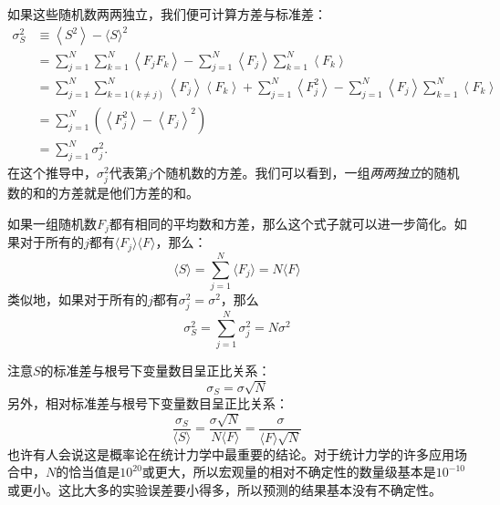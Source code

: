\documentclass[UTF8]{ctexart}
\numberwithin{equation}{section}%
\numberwithin{figure}{section}%
\begin{document}
    如果这些随机数两两独立，我们便可计算方差与标准差：
    \begin{equation}
        \begin{aligned}
            \sigma_{S}^{2} & \equiv\left\langle S^{2}\right\rangle-\langle S\rangle^{2} \\
            &=\sum_{j=1}^{N} \sum_{k=1}^{N}\left\langle F_{j} F_{k}\right\rangle-\sum_{j=1}^{N}\left\langle F_{j}\right\rangle \sum_{k=1}^{N}\left\langle F_{k}\right\rangle \\
            &=\sum_{j=1}^{N} \sum_{k=1(k \neq j)}^{N}\left\langle F_{j}\right\rangle\left\langle F_{k}\right\rangle+\sum_{j=1}^{N}\left\langle F_{j}^{2}\right\rangle-\sum_{j=1}^{N}\left\langle F_{j}\right\rangle \sum_{k=1}^{N}\left\langle F_{k}\right\rangle \\
            &=\sum_{j=1}^{N}\left(\left\langle F_{j}^{2}\right\rangle-\left\langle F_{j}\right\rangle^{2}\right) \\
            &=\sum_{j=1}^{N} \sigma_{j}^{2} .
            \end{aligned}
    \end{equation}
    在这个推导中，$\sigma_j^2$代表第$j$个随机数的方差。我们可以看到，一组\textit{两两独立}的随机数的和的方差就是他们方差的和。

    如果一组随机数$F_j$都有相同的平均数和方差，那么这个式子就可以进一步简化。如果对于所有的$j$都有$\langle{F_j}\rangle\langle{F}\rangle$，那么：
    \begin{equation}
        \langle{S}\rangle=\sum^N_{j=1}\langle{F_j}\rangle=N\langle{F}\rangle
    \end{equation}
    类似地，如果对于所有的$j$都有$\sigma_j^2=\sigma^2$，那么
    \begin{equation}
        \sigma_S^2=\sum^N_{j=1}\sigma_j^2=N\sigma^2
    \end{equation}

    注意$S$的标准差与根号下变量数目呈正比关系：
    \begin{equation}
        \sigma_S=\sigma \sqrt{N}
    \end{equation}
    另外，相对标准差与根号下变量数目呈正比关系：
    \begin{equation}
        \frac{\sigma_S}{\langle{S}\rangle}=\frac{\sigma\sqrt{N}}{N\langle{F}\rangle}=\frac{\sigma}{\langle{F}\rangle\sqrt{N}}
    \end{equation}
    也许有人会说这是概率论在统计力学中最重要的结论。对于统计力学的许多应用场合中，$N$的恰当值是$10^{20}$或更大，所以宏观量的相对不确定性的数量级基本是$10^{-10}$或更小。这比大多的实验误差要小得多，所以预测的结果基本没有不确定性。
\end{document}
